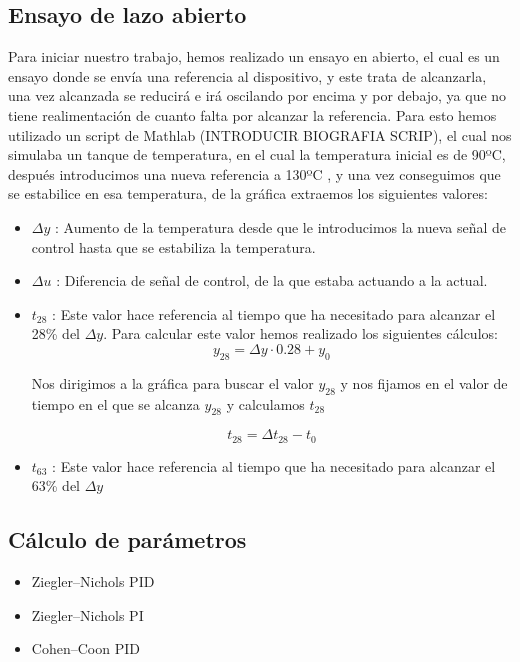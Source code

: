 \documentclass[11pt]{article}
\begin{document}
\subsection{Ensayo de lazo abierto}
Para iniciar nuestro trabajo, hemos realizado un ensayo en abierto, el cual es un ensayo donde se envía una referencia al dispositivo, y este trata de alcanzarla, una vez alcanzada se reducirá e irá oscilando por encima y por debajo, ya que no tiene realimentación de cuanto falta por alcanzar la referencia.
Para esto hemos utilizado un script de Mathlab (INTRODUCIR BIOGRAFIA SCRIP), el cual nos simulaba un tanque de temperatura, en el cual la temperatura inicial es de 90ºC, después introducimos una nueva referencia a 130ºC , y una vez conseguimos que se estabilice en esa temperatura, de la gráfica extraemos los siguientes valores:
\begin{itemize}
    \item $\Delta y$ : Aumento de la temperatura desde que le introducimos la nueva señal de control hasta que se estabiliza la temperatura.

    \item $\Delta u$ : Diferencia de señal de control, de la que estaba actuando a la actual.

    \item $t_{28}$ : Este valor hace referencia al tiempo que ha necesitado para alcanzar el 28\% del $\Delta y$.
    Para calcular este valor hemos realizado los siguientes cálculos:\\
    $$ y_{28} = \Delta y \cdot  0.28 + y_{0}  $$

    Nos dirigimos a la gráfica para buscar el valor $y_{28}$ y nos fijamos en el valor de tiempo en el que se alcanza $y_{28}$ y calculamos $t_{28}$

    $$ t_{28} = \Delta t_{28} - t_{0}$$

    \item $t_{63}$ : Este valor hace referencia al tiempo que ha necesitado para alcanzar el 63\% del $\Delta y$
\end{itemize}



\subsection{Cálculo de parámetros}
    \begin{itemize} 
        \item Ziegler–Nichols PID \\
        
        \item Ziegler–Nichols PI \\
        
        \item Cohen–Coon PID
    \end{itemize}
\end{document}
